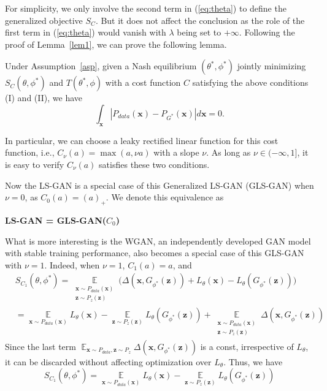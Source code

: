 For simplicity, we only involve the second term in (\ref{eq:theta}) to define the generalized objective $S_C$. But it does not affect the conclusion as the role of the first term in (\ref{eq:theta}) would vanish with $\lambda$ being set to $+\infty$. Following the proof of Lemma~\ref{lem1}, we can prove the following lemma.
\begin{lemma}\label{lem5}
Under Assumption~\ref{asp}, given a Nash equilibrium $(\theta^*,\phi^*)$ jointly minimizing $S_C(\theta,\phi^*)$ and $T(\theta^*,\phi)$ with a cost function $C$ satisfying the above conditions (I) and (II), we have
$$
\int_{\mathbf x}|P_{data}(\mathbf x)-P_{G^*}(\mathbf x)|d\mathbf x = 0.
$$
\end{lemma}

In particular, we can choose a leaky rectified linear function for this cost function, i.e., $C_\nu(a)=\max(a,\nu a)$ with a slope $\nu$. As long as $\nu\in(-\infty,1]$, it is easy to verify $C_\nu(a)$ satisfies these two conditions.


Now the LS-GAN is a special case of this Generalized LS-GAN (GLS-GAN) when $\nu=0$, as $C_0(a)=(a)_+$. We denote this equivalence as

\vspace{1mm}
\centerline{\bf LS-GAN = GLS-GAN($C_0$)}
\vspace{1mm}

What is more interesting is the WGAN, an independently developed GAN model with stable training performance, also becomes a special case of this GLS-GAN with $\nu=1$.  Indeed, when $\nu=1$, $C_1(a)=a$, and
\[
\begin{aligned}
&S_{C_1}(\theta,\phi^*)
= \mathop \mathbb E\limits_{\substack{\mathbf x\sim P_{data}(\mathbf x) \\ \mathbf z\sim P_{z}(\mathbf z)}}\big( \Delta(\mathbf x, G_{\phi^*}(\mathbf z)) + L_\theta(\mathbf x) - L_\theta(G_{\phi^*}(\mathbf z))\big)\\
&=  \mathop \mathbb E\limits_{\mathbf x\sim P_{data}(\mathbf x)} L_\theta(\mathbf x) - \mathop \mathbb E\limits_{\mathbf z\sim P_{z}(\mathbf z)} L_\theta(G_{\phi^*}(\mathbf z))
+\mathop \mathbb E\limits_{\substack{\mathbf x\sim P_{data}(\mathbf x) \\ \mathbf z\sim P_{z}(\mathbf z)}}\Delta(\mathbf x, G_{\phi^*}(\mathbf z))
\end{aligned}
\]
Since the last term $\mathop \mathbb E_{{\mathbf x\sim P_{data}, \mathbf z\sim P_{z}}}\Delta(\mathbf x, G_{\phi^*}(\mathbf z))$ is a const, irrespective of $L_\theta$, it can be discarded without affecting optimization over $L_\theta$. Thus, we have
$$
S_{C_1}(\theta,\phi^*)=\mathop \mathbb E\limits_{\mathbf x\sim P_{data}(\mathbf x)} L_\theta(\mathbf x) - \mathop \mathbb E\limits_{\mathbf z\sim P_{z}(\mathbf z)} L_\theta(G_{\phi^*}(\mathbf z))
$$


